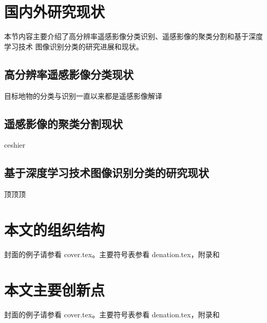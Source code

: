 \section{国内外研究现状}
\label{sec:second}
本节内容主要介绍了高分辨率遥感影像分类识别、遥感影像的聚类分割和基于深度学习技术\citep{hinton2006fast, bengio2009learning, NIPS2012_4824} 图像识别分类的研究进展和现状。

\subsection{高分辨率遥感影像分类现状}
\label{subsec:1-2-1}
目标地物的分类与识别一直以来都是遥感影像解译


\subsection{遥感影像的聚类分割现状}
\label{subsec:1-2-2}
ceshier

\subsection{基于深度学习技术图像识别分类的研究现状}
\label{subsec:1-2-3}
顶顶顶

\section{本文的组织结构}
\label{sec:third}
封面的例子请参看 cover.tex。主要符号表参看 denation.tex，附录和

\section{本文主要创新点}
\label{sec:forth}
封面的例子请参看 cover.tex。主要符号表参看 denation.tex，附录和
